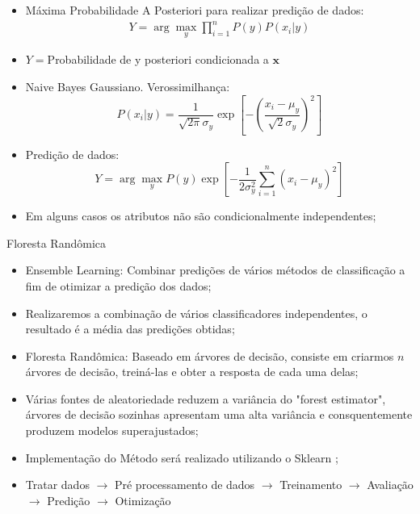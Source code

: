 \documentclass[compress]{beamer}
\begin{document}
\begin{frame}{}
    \begin{itemize}
        \item Máxima Probabilidade A Posteriori para realizar predição de dados:
        \begin{align}
            Y=\arg \max_{y} \prod_{i=1}^{n}P(y)P(x_i|y)
        \end{align}
        \item $Y=$Probabilidade de y posteriori condicionada a $\mathbf{x}$
        \item Naive Bayes Gaussiano. Verossimilhança\cite{scikit-learn}:
        $$P\left(x_i|y\right)=\frac{1}{\sqrt{2\pi}\sigma_{y}}\exp\left[-\left(\frac{x_i-\mu_y}{\sqrt{2}\sigma_y}\right)^2\right]$$
        \item Predição de dados:
        $$\displaystyle Y=\arg \max_{y}P(y)\exp\left[-\frac{1}{2\sigma_y^2}\sum_{i=1}^{n}\left(x_i-\mu_y\right)^2\right]$$
        \item Em alguns casos os atributos não são condicionalmente independentes;
    \end{itemize}
\end{frame}


\begin{frame}{Floresta Randômica}
\begin{itemize}
    \item Ensemble Learning: Combinar predições de vários métodos de classificação a fim de otimizar a predição dos dados;
    \item Realizaremos a combinação de vários classificadores independentes, o resultado é a média das predições obtidas;
    \item Floresta Randômica: Baseado em árvores de decisão, consiste em criarmos $n$ árvores de decisão, treiná-las e obter a resposta de cada uma delas;
    \item Várias fontes de aleatoriedade reduzem a variância do "forest estimator", árvores de decisão sozinhas apresentam uma alta variância e consquentemente produzem modelos superajustados;
\end{itemize}
    
\end{frame}


\begin{frame}{}
    \begin{itemize}
        \item Implementação do Método será realizado utilizando o Sklearn \cite{scikit-learn};
        \item Tratar dados $\to$ Pré processamento de dados $\to$ Treinamento $\to$ Avaliação $\to$ Predição $\to$ Otimização
    \end{itemize}
\end{frame}
\end{document}
